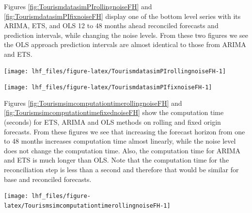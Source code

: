 \documentclass[11pt,a4paper,]{article}
\let\origfigure\figure
\let\endorigfigure\endfigure
\renewenvironment{figure}[1][2] {
    \expandafter\origfigure\expandafter[!htbp]
} {
    \endorigfigure
}
\begin{document}
Figures \ref{fig:TourismdatasimPIrollingnoiseFH} and \ref{fig:TourismdatasimPIfixnoiseFH} display one of the bottom level series with its ARIMA, ETS, and OLS 12 to 48 months ahead reconciled forecasts and prediction intervals, while changing the noise levels. From these two figures we see the OLS approach prediction intervals are almost identical to those from ARIMA and ETS.

\begin{figure}

{\centering \texttt{[image: lhf\_files/figure-latex/TourismdatasimPIrollingnoiseFH-1]} 

}

\caption{Comparing reconciled 'rolling origin' forecasts and prediction intervals for a sample bottom-level series across different error levels (different panels).}\label{fig:TourismdatasimPIrollingnoiseFH}
\end{figure}

\begin{figure}

{\centering \texttt{[image: lhf\_files/figure-latex/TourismdatasimPIfixnoiseFH-1]} 

}

\caption{Comparing reconciled 'fixed origin' forecasts and prediction intervals for a sample bottom-level series across different error levels (different panels).}\label{fig:TourismdatasimPIfixnoiseFH}
\end{figure}

Figures \ref{fig:TourismsimcomputationtimerollingnoiseFH} and \ref{fig:TourismsimcomputationtimefixednoiseFH} show the computation time (seconds) for ETS, ARIMA and OLS methods on rolling and fixed origin forecasts. From these figures we see that increasing the forecast horizon from one to 48 months increases computation time almost linearly, while the noise level does not change the computation time. Also, the computation time for ARIMA and ETS is much longer than OLS. Note that the computation time for the reconciliation step is less than a second and therefore that would be similar for base and reconciled forecasts.

\begin{figure}

{\centering \texttt{[image: lhf\_files/figure-latex/TourismsimcomputationtimerollingnoiseFH-1]} 

}

\caption{Computation time (seconds) for rolling origin reconciled forecasts using ETS, ARIMA and OLS, by horizon and by different error values (panels), for 304 bottom-level series and 8 levels of hierarchy.}\label{fig:TourismsimcomputationtimerollingnoiseFH}
\end{figure}
\end{document}
